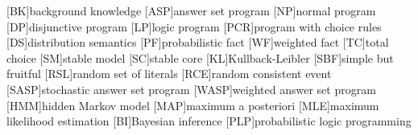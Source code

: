 \newcommand{\pwt}[1]{\ensuremath{\pwT\at{#1}}}     
\newcommand{\pwM}{\ensuremath{\mu_{\MODELset}}}   
\newcommand{\pwm}[1]{\ensuremath{\pwM\at{#1}}}     
\newcommand{\pwC}{\ensuremath{\mu_{\textrm{\cla{C}}}}}   
\newcommand{\pwc}[1]{\ensuremath{\pwC\at{#1}}}     
\newcommand{\pwE}{\ensuremath{\mu_{\EVENTSset}}}   
\newcommand{\pwe}[1]{\ensuremath{\pwE\at{#1}}}     
%
%
%
\newcommand{\stablecore}[1]{\ensuremath{\left\llbracket #1 \right\rrbracket}}
\newcommand{\inconsistent}{\bot}
\newcommand{\given}{\ensuremath{~\middle|~}}
\newcommand{\consequenceclass}{\ensuremath{\Lambda}}
\newcommand{\indepclass}{\ensuremath{\Diamond}}
\newcommand{\probfact}[2]{\ensuremath{#1:#2}}
\newcommand{\probrule}[3]{\probfact{#1}{#2} \leftarrow #3}
\newcommand{\weightfact}[2]{\ensuremath{#1:#2}}
\newcommand{\weightrule}[3]{\weightfact{#1}{#2} \leftarrow #3}
\newcommand{\class}[1]{\ensuremath{[{#1}]_{\sim}}}
\newcommand{\tcgen}[1]{\MODELset\at{#1}}
\newcommand{\condsymb}[2]{\ensuremath{p_{#1|#2}}}
\newcommand{\lpmln}{\texttt{LP\textsuperscript{MLN}}}
\newcommand{\emptyevent}{\ensuremath{\lambda}}
\newcommand{\powerset}[1]{\ensuremath{\mathrm{2}^{#1}}}
%
%
[BK]{background knowledge}
[ASP]{answer set program}
[NP]{normal program}
[DP]{disjunctive program}
[LP]{logic program}
[PCR]{program with choice rules}
[DS]{distribution semantics}
[PF]{probabilistic fact}
[WF]{weighted fact}
[TC]{total choice}
[SM]{stable model}
[SC]{stable core}
[KL]{Kullback-Leibler}
[SBF]{simple but fruitful}
[RSL]{random set of literals}
[RCE]{random consistent event}
[SASP]{stochastic answer set program}
[WASP]{weighted answer set program}
[HMM]{hidden Markov model}
[MAP]{maximum a posteriori}
[MLE]{maximum likelihood estimation}
[BI]{Bayesian inference}
[PLP]{probabilistic logic programming}
%
%
\newcommand{\sbf}{\ensuremath{\mathrm{1}}}
%
%
\newcommand{\LOOK}{\ensuremath{\blacksquare}}
\newcommand{\delete}[1]{\sout{#1}}
\newcommand{\sidenote}[1]{\stepcounter{revcounter}{\color{red!50!black}\(\vert^{\arabic{revcounter}}\)}\marginpar{{\color{red!50!black}\(^{\arabic{revcounter}}\vert\)}\scriptsize #1}}
\newcommand{\defnote}[1]{\marginpar{\scriptsize{{\color{blue!50!black}\bf def.~}#1}}}
\newcommand{\topicnote}[1]{{\scriptsize\color{red!50!black}$\blacktriangleright$}\marginpar{\scriptsize{\color{red!50!black}\it #1}}}
\newcommand{\replace}[2]{\delete{#1}\sidenote{#2}}
\newcommand{\franc}[1]{{\color{green!30!black}#1}}
\newcommand{\bruno}{\color{red!60!black}}
\newcommand{\dietmar}[1]{{\color{brown!40!black}#1}}

